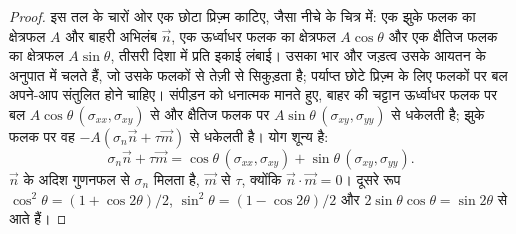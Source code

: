 \begin{proof}
इस तल के चारों ओर एक छोटा प्रिज़्म काटिए, जैसा नीचे के चित्र में: एक झुके फलक का क्षेत्रफल $A$ और बाहरी अभिलंब $\vec n$, एक ऊर्ध्वाधर फलक का क्षेत्रफल $A\cos\theta$ और एक क्षैतिज फलक का क्षेत्रफल $A\sin\theta$, तीसरी दिशा में प्रति इकाई लंबाई। उसका भार और जड़त्व उसके आयतन के अनुपात में चलते हैं, जो उसके फलकों से तेज़ी से सिकुड़ता है; पर्याप्त छोटे प्रिज़्म के लिए फलकों पर बल अपने-आप संतुलित होने चाहिए। संपीड़न को धनात्मक मानते हुए, बाहर की चट्टान ऊर्ध्वाधर फलक पर बल $A\cos\theta\,(\sigma_{xx}, \sigma_{xy})$ से और क्षैतिज फलक पर $A\sin\theta\,(\sigma_{xy}, \sigma_{yy})$ से धकेलती है; झुके फलक पर वह $-A(\sigma_n\vec n + \tau\vec m)$ से धकेलती है। योग शून्य है:
\[
  \sigma_n\vec n + \tau\vec m = \cos\theta\,(\sigma_{xx}, \sigma_{xy}) + \sin\theta\,(\sigma_{xy}, \sigma_{yy}) .
\]
$\vec n$ के अदिश गुणनफल से $\sigma_n$ मिलता है, $\vec m$ से $\tau$, क्योंकि $\vec n\cdot\vec m = 0$। दूसरे रूप $\cos^2\theta = (1+\cos2\theta)/2$, $\sin^2\theta = (1-\cos2\theta)/2$ और $2\sin\theta\cos\theta = \sin2\theta$ से आते हैं।
\end{proof}

